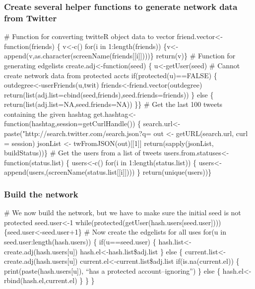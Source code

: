 \documentclass[xcolor=dvipsnames, 9pt]{beamer}
\newenvironment{code}{\begin{semiverbatim} \begin{footnotesize}}
{\end{footnotesize}\end{semiverbatim}}
\begin{document}
\begin{frame}[fragile]
    \frametitle{Create several helper functions to generate network data from Twitter}
    \begin{block}{}
    \begin{code}
\tiny{\alert<2>{# Function for converting twitteR object data to vector
friend.vector<-function(friends) \{
    v<-c()
    for(i in 1:length(friends)) \{v<-append(v,as.character(screenName(friends[[i]])))\}
    return(v)\}}
\alert<3>{# Function for generating edgelists
create.adj<-function(seed) \{
    u<-getUser(seed)
    # Cannot create network data from protected accts
    if(protected(u)==FALSE) \{
        outdegree<-userFriends(u,twit)
        friends<-friend.vector(outdegree)
        return(list(adj.list=cbind(seed,friends),seed.friends=friends))
    \}
    else \{
        return(list(adj.list=NA,seed.friends=NA))
    \}\}}
\alert<4>{# Get the last 100 tweets containing the given hashtag
get.hashtag<-function(hashtag,session=getCurlHandle()) \{
    search.url<-paste("http://search.twitter.com/search.json?q=%
    out <- getURL(search.url, curl = session)
    jsonList <- twFromJSON(out)[[1]]
    return(sapply(jsonList, buildStatus))\}}
\alert<5>{# Get the users from a list of tweets
users.from.statuses<-function(status.list) \{
    users<-c()
    for(i in 1:length(status.list)) \{
        users<-append(users,(screenName(status.list[[i]])))
    \}
    return(unique(users))\}}}
\end{code}
    \end{block}
\end{frame}

\begin{frame}[fragile]
    \frametitle{Build the network}
    \begin{block}{}
        \begin{code}
\alert<2>{# We now build the network, but we have to make sure the initial seed is not protected
seed.user<-1
while(protected(getUser(hash.users[seed.user]))) \{seed.user<-seed.user+1\}}
\alert<3>{# Now create the edgelists for all uses 
for(u in seed.user:length(hash.users)) \{
    if(u==seed.user) \{
        hash.list<-create.adj(hash.users[u])
        hash.el<-hash.list\$adj.list
    \}}
    \alert<4>{else \{
        current.list<-create.adj(hash.users[u])
        current.el<-current.list\$adj.list
        if(is.na(current.el)) \{
            print(paste(hash.users[u]), ``has a protected account--ignoring'')
        \}}
        \alert<5>{else \{
            hash.el<-rbind(hash.el,current.el)
        \}
    \}
\}}
        \end{code}
    \end{block}
\end{frame}
\end{document}
